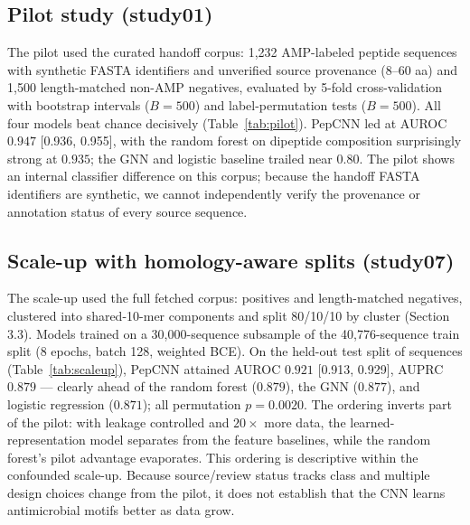 \subsection{Pilot study (study01)}
The pilot used the curated handoff corpus: 1{,}232 AMP-labeled peptide sequences with synthetic FASTA
identifiers and unverified source provenance (8--60 aa) and 1{,}500 length-matched non-AMP negatives, evaluated
by 5-fold cross-validation with bootstrap intervals ($B=500$) and
label-permutation tests ($B=500$). All four models beat chance decisively
(Table~\ref{tab:pilot}). PepCNN led at AUROC $0.947$ [0.936, 0.955], with the
random forest on dipeptide composition surprisingly strong at $0.935$; the
GNN and logistic baseline trailed near $0.80$. The pilot shows an internal classifier difference on this corpus; because
the handoff FASTA identifiers are synthetic, we cannot independently
verify the provenance or annotation status of every source sequence.

\subsection{Scale-up with homology-aware splits (study07)}
The scale-up used the full fetched corpus: \Npos{} positives and \Nneg{}
length-matched negatives, clustered into \Nclusters{} shared-10-mer
components and split 80/10/10 by cluster (Section 3.3). Models trained on a
30{,}000-sequence subsample of the 40{,}776-sequence train split (8 epochs,
batch 128, weighted BCE). On the held-out test split of \Ntest{} sequences
(Table~\ref{tab:scaleup}), PepCNN attained AUROC $0.921$ [0.913, 0.929],
AUPRC $0.879$ --- clearly ahead of the random forest ($0.879$), the GNN
($0.877$), and logistic regression ($0.871$); all permutation $p=0.0020$.
The ordering inverts part of the pilot: with leakage controlled and $20\times$
more data, the learned-representation model separates from the feature
baselines, while the random forest's pilot advantage evaporates. This ordering is descriptive within the confounded scale-up. Because source/review status tracks class and multiple design choices change from the pilot, it does not establish that the CNN learns antimicrobial motifs better as data grow.

